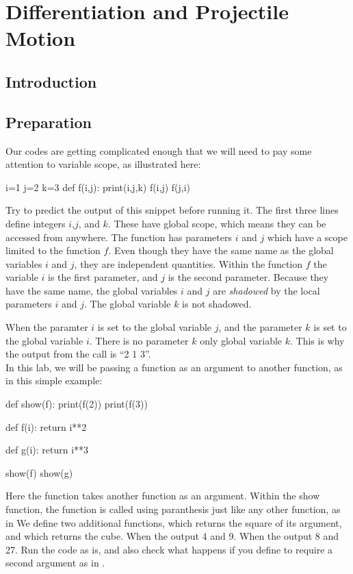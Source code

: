 \chapter{Differentiation and Projectile Motion}

\section{Introduction}

\section{Preparation}


Our codes are getting complicated enough that we will need to pay some
attention to variable scope, as illustrated here:
\begin{python}
i=1
j=2
k=3
def f(i,j):
    print(i,j,k)
f(i,j)
f(j,i)
\end{python}
Try to predict the output of this snippet before running it.  The
first three lines define integers $i$,$j$, and $k$. These have global
scope, which means they can be accessed from anywhere.  The function
 has parameters $i$ and $j$ which have a scope limited to
the function $f$.  Even though they have the same name as the global
variables $i$ and $j$, they are independent quantities.  Within the
function $f$ the variable $i$ is the first parameter, and $j$ is the
second parameter.  Because they have the same name, the global
variables $i$ and $j$ are {\em shadowed} by the local parameters $i$
and $j$.  The global variable $k$ is not shadowed.

When  the paramter $i$ is set to the global variable $j$,
and the parameter $k$ is set to the global variable $i$.  There is no
parameter $k$ only global variable $k$.  This is why the output from
the call is ``2 1 3''.\\

In this lab, we will be passing a function as an argument to another
function, as in this simple example:
\begin{python}
def show(f):
    print(f(2))
    print(f(3))    
    
def f(i):
    return i**2

def g(i):
    return i**3

show(f)
show(g)    
\end{python}
Here the  function takes another function  as an
argument.  Within the show function, the function  is called
using paranthesis just like any other function, as in  We
define two additional functions,  which returns the square of
its argument, and  which returns the cube.  When
 the output 4 and 9.  When  the output 8
and 27.  Run the code as is, and also check what happens if you define
 to require a second argument as in .

